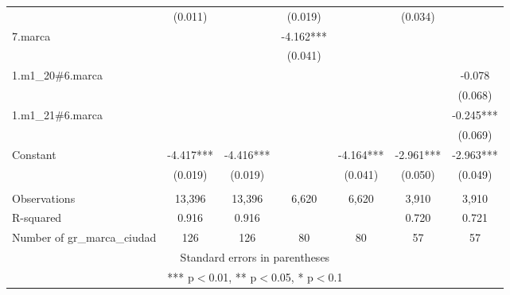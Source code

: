 \begin{longtable}{lcccccc}
 & (0.011) &  & (0.019) &  & (0.034) &  \\
7.marca &  &  & -4.162*** &  &  &  \\
 &  &  & (0.041) &  &  &  \\
1.m1\_20\#6.marca &  &  &  &  &  & -0.078 \\
 &  &  &  &  &  & (0.068) \\
1.m1\_21\#6.marca &  &  &  &  &  & -0.245*** \\
 &  &  &  &  &  & (0.069) \\
Constant & -4.417*** & -4.416*** &  & -4.164*** & -2.961*** & -2.963*** \\
 & (0.019) & (0.019) &  & (0.041) & (0.050) & (0.049) \\
 &  &  &  &  &  &  \\
Observations & 13,396 & 13,396 & 6,620 & 6,620 & 3,910 & 3,910 \\
R-squared & 0.916 & 0.916 &  &  & 0.720 & 0.721 \\
 Number of gr\_marca\_ciudad & 126 & 126 & 80 & 80 & 57 & 57 \\ \hline
\multicolumn{7}{c}{ Standard errors in parentheses} \\
\multicolumn{7}{c}{ *** p$<$0.01, ** p$<$0.05, * p$<$0.1} \\
\end{longtable}
